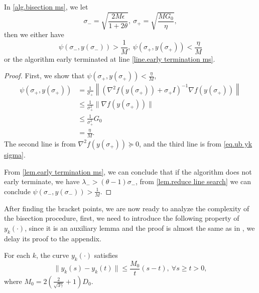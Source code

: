 \documentclass{article}
\begin{document}
\begin{lemma}
    \label{lem.bracketing points}
    In \autoref{alg.bisection ms}, we let 
    \begin{equation}
        \label{eq.bracket points}
        \sigma_- = \sqrt{\frac{2M\epsilon}{1+2\theta}}, \ \sigma_+ = \sqrt{\frac{MG_0}{\eta}},
    \end{equation}
    then we either have
    \begin{equation*}
        \psi\left (\sigma_-,y(\sigma_-)\right) >\frac{1}{M}, \ \psi\left (\sigma_+,y(\sigma_+)\right) <\frac{\eta}{M}
    \end{equation*}
    or the algorithm early terminated at line \ref{line.early termination ms}.
\end{lemma}
\begin{proof}
    First, we show that $\psi(\sigma_+,y(\sigma_+))<\frac{\eta}{M}$,
    \begin{equation*}
        \begin{aligned}
        \psi(\sigma_+,y(\sigma_+)) &= \frac{1}{\sigma_+}\left \|\left(\nabla^2 f(y(\sigma_+))+\sigma_+ I\right)^{-1}\nabla f(y(\sigma_+))\right\| \\
        &\leq \frac{1}{\sigma_+^2}\|\nabla f(y(\sigma_+))\| \\
        &\leq \frac{1}{\sigma_+^2} G_0\\
        &= \frac{\eta}{M}.
        \end{aligned}
    \end{equation*}
    The second line is from $\nabla^2 f(y(\sigma_+))\succeq 0$, and the third line is from \eqref{eq.ub yk sigma}. 
    
    From \autoref{lem.early termination ms}, we can conclude that if the algorithm does not early terminate, we have $\lambda_- > (\theta-1)\sigma_-$, from \autoref{lem.reduce line search} we can conclude $\psi(\sigma_-,y(\sigma_-))>\frac{1}{M}.$
\end{proof}
After finding the bracket points, we are now ready to analyze the complexity of the bisection procedure, first, we need to introduce the following property of $y_k(\cdot)$, since it is an auxiliary lemma and the proof is almost the same as in \citet{monteiro2013accelerated}, we delay its proof to the appendix.
\begin{lemma}
\label{lem.curve condition}
    For each $k$, the curve $y_k(\cdot)$ satisfies
    \begin{equation}
        \label{eq.curve condition}
        \|y_k(s)-y_k(t)\| \leq \frac{M_0}{t}(s-t), \ \forall s\geq t >0,
    \end{equation}
    where $M_0 = 2\left (\frac{2}{\sqrt{3\gamma}}+1\right) D_0$.
\end{lemma}
\end{document}
